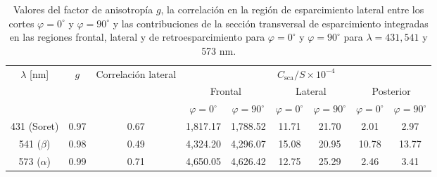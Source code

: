 %
\begin{table}[h!]
	\begin{tabular}{ccccccccc}
		\hline
		\multirow{3}{*}{$\lambda$ [nm]} & \multirow{3}{*}{$g$} & \multirow{3}{5em}{Correlación lateral} & \multicolumn{6}{c}{$C_{\text{sca}}/S\times 10^{-4}$ } \\
		\cline{4-9}
		& &  &   \multicolumn{2}{c}{Frontal} & \multicolumn{2}{c}{Lateral} & \multicolumn{2}{c}{Posterior}\\
		\cline{4-9}
		&  &  &  $\varphi=0^{\circ}$ & $\varphi=90^{\circ}$ &$\varphi=0^{\circ}$ & $\varphi=90^{\circ}$ &$\varphi=0^{\circ}$ & $\varphi=90^{\circ}$ \\ \hline
		431 (Soret) & 0.97  & 0.67 & 1,817.17 & 1,788.52 & 11.71 & 21.70 & 2.01 & 2.97  \\
		541 ($\beta$) & 0.98 & 0.49 & 4,324.20 & 4,296.07 & 15.08 & 20.95 & 10.78 & 13.77\\
		573 ($\alpha$) & 0.99 & 0.71 & 4,650.05 & 4,626.42 & 12.75 & 25.29 & 2.46 & 3.41\\
		\hline
	\end{tabular}
	\caption{Valores del factor de anisotropía $g$, la correlación en la región de esparcimiento lateral entre los cortes $\varphi=0^\circ$ y $\varphi=90^\circ$ y las contribuciones de la sección transversal de esparcimiento integradas en las regiones frontal, lateral y de retroesparcimiento para $\varphi=0^{\circ}$ y $\varphi=90^{\circ}$ para $\lambda=431,541$ y 573 nm. }
	\label{table:val_eri}
	\vspace{0.2cm} 
\end{table}
%




